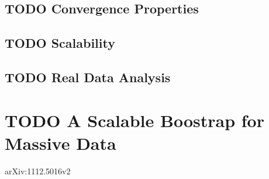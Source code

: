 \documentclass[11pt]{article}
\begin{document}
\subsection{{\bfseries\sffamily TODO} Convergence Properties}
\label{sec:org7f3f1e7}
\subsection{{\bfseries\sffamily TODO} Scalability}
\label{sec:org19d03ad}
\subsection{{\bfseries\sffamily TODO} Real Data Analysis}
\label{sec:org9d643a8}

\section{{\bfseries\sffamily TODO} A Scalable Boostrap for Massive Data}
\label{sec:org9801462}
arXiv:1112.5016v2
\end{document}

